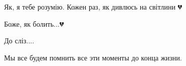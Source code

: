  
 
 
 
 

\qqSecCmt


Як, я тебе розумію. Кожен раз, як дивлюсь на світлини 💔


Боже, як болить...💔


До сліз....


Мы все будем помнить все эти моменты до конца жизни.
